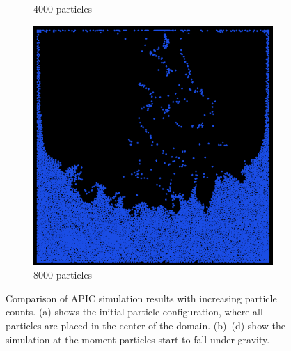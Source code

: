 \begin{figure}[h]
\begin{subfigure}[b]{0.2\textwidth}
        \caption{4000 particles}
    \end{subfigure}
    \begin{subfigure}[b]{0.2\textwidth}
        \includegraphics[width=\textwidth]{figures/apic8000.png}
        \caption{8000 particles}
    \end{subfigure}
    \caption{Comparison of APIC simulation results with increasing particle counts. 
    (a) shows the initial particle configuration, where all particles are placed in the center of the domain. 
    (b)–(d) show the simulation at the moment particles start to fall under gravity.}
    \label{fig:apic_comparison}
\end{figure}
